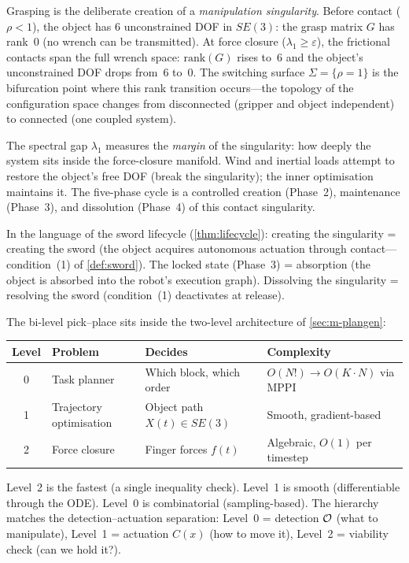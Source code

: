 \begin{remark}
\label{rem:m-singularity}
Grasping is the deliberate creation of a \emph{manipulation
singularity}.  Before contact ($\rho < 1$), the object has 6
unconstrained DOF in $SE(3)$: the grasp matrix $G$ has rank~0
(no wrench can be transmitted).  At force closure
($\lambda_1 \geq \varepsilon$), the frictional contacts span
the full wrench space: $\mathrm{rank}(G)$ rises to~6 and the
object's unconstrained DOF drops from~6 to~0.  The switching
surface $\Sigma = \{\rho = 1\}$ is the bifurcation point where
this rank transition occurs---the topology of the configuration
space changes from disconnected (gripper and object independent)
to connected (one coupled system).

The spectral gap $\lambda_1$ measures the \emph{margin} of the
singularity: how deeply the system sits inside the force-closure
manifold.  Wind and inertial loads attempt to restore the
object's free DOF (break the singularity); the inner
optimisation maintains it.
The five-phase cycle is a controlled creation (Phase~2),
maintenance (Phase~3), and dissolution (Phase~4) of this
contact singularity.

In the language of the sword lifecycle (\cref{thm:lifecycle}):
creating the singularity = creating the sword (the object acquires
autonomous actuation through contact---condition~(1) of
\cref{def:sword}).  The locked state (Phase~3) = absorption (the
object is absorbed into the robot's execution graph).  Dissolving
the singularity = resolving the sword (condition~(1) deactivates
at release).
\end{remark}

\begin{remark}\label{rem:m-threelevel}
The bi-level pick--place sits inside the two-level architecture
of \cref{sec:m-plangen}:
\begin{center}
\begin{tabular}{@{}cllp{5cm}@{}}
\toprule
\textbf{Level} & \textbf{Problem} & \textbf{Decides}
  & \textbf{Complexity} \\
\midrule
0 & Task planner & Which block, which order
  & $O(N!) \to O(K \cdot N)$ via MPPI \\
1 & Trajectory optimisation & Object path $X(t) \in SE(3)$
  & Smooth, gradient-based \\
2 & Force closure & Finger forces $f(t)$
  & Algebraic, $O(1)$ per timestep \\
\bottomrule
\end{tabular}
\end{center}
Level~2 is the fastest (a single inequality check).  Level~1 is
smooth (differentiable through the ODE).  Level~0 is
combinatorial (sampling-based).  The hierarchy matches the
detection--actuation separation: Level~0 = detection
$\mathcal{O}$ (what to manipulate), Level~1 = actuation $C(x)$
(how to move it), Level~2 = viability check (can we hold it?).
\end{remark}

